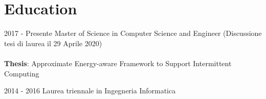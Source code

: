 \documentclass[letterpaper]{twentysecondcvit} %
\begin{document}
\makeprofile %

\section{Education}
\begin{twenty}
	\twentyitem
	{2017 -}
	{Presente}
	{Master of Science in Computer Science and Engineer}
	{}
	{
	(Discussione tesi di laurea il 29 Aprile 2020)\\ \\
	{
	\textbf{Thesis}: Approximate Energy-aware Framework to Support Intermittent Computing
	}
	}
	{\footnotesize{}}

	\twentyitem
	{2014 - 2016}
	{}
	{Laurea triennale in Ingegneria Informatica}
	{}
	{}
	{\footnotesize{}}
\end{twenty}


\end{document}

